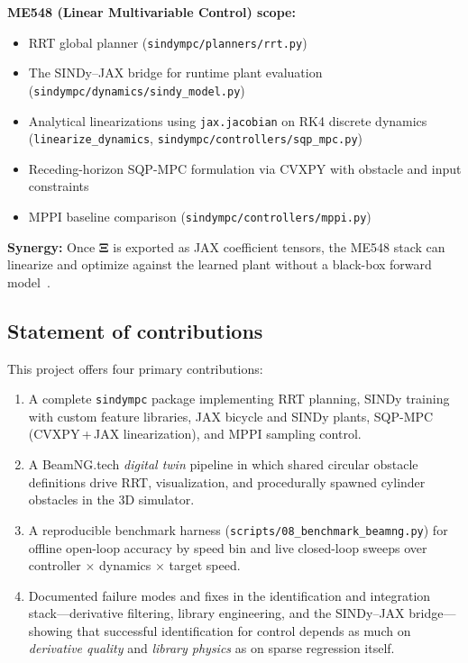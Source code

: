 \documentclass[letterpaper, 10 pt, conference]{ieeeconf}  %
\begin{document}
\textbf{ME548 (Linear Multivariable Control) scope:}
\begin{itemize}
  \item RRT global planner (\texttt{sindympc/planners/rrt.py})
  \item The SINDy--JAX bridge for runtime plant evaluation (\texttt{sindympc/dynamics/sindy\_model.py})
  \item Analytical linearizations using \texttt{jax.jacobian} on RK4 discrete dynamics (\texttt{linearize\_dynamics}, \texttt{sindympc/controllers/sqp\_mpc.py})
  \item Receding-horizon SQP-MPC formulation via CVXPY with obstacle and input constraints
  \item MPPI baseline comparison (\texttt{sindympc/controllers/mppi.py})
\end{itemize}

\textbf{Synergy:} Once $\boldsymbol{\Xi}$ is exported as JAX coefficient tensors, the ME548 stack can linearize and optimize against the learned plant without a black-box forward model~\cite{Brunton2016SINDy,Corbetta2020}.

\subsection{Statement of contributions}

This project offers four primary contributions:
\begin{enumerate}
  \item A complete \texttt{sindympc} package implementing RRT planning, SINDy training with custom feature libraries, JAX bicycle and SINDy plants, SQP-MPC (CVXPY\,+\,JAX linearization), and MPPI sampling control.
  \item A BeamNG.tech \emph{digital twin} pipeline in which shared circular obstacle definitions drive RRT, visualization, and procedurally spawned cylinder obstacles in the 3D simulator.
  \item A reproducible benchmark harness (\texttt{scripts/08\_benchmark\_beamng.py}) for offline open-loop accuracy by speed bin and live closed-loop sweeps over controller $\times$ dynamics $\times$ target speed.
  \item Documented failure modes and fixes in the identification and integration stack---derivative filtering, library engineering, and the SINDy--JAX bridge---showing that successful identification for control depends as much on \emph{derivative quality} and \emph{library physics} as on sparse regression itself.
\end{enumerate}
\end{document}
